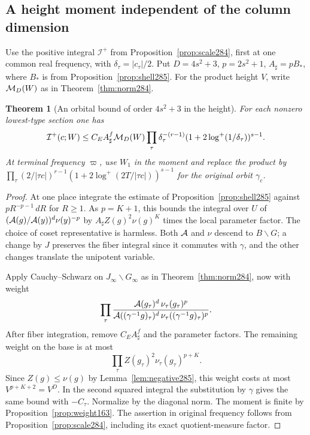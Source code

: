 \documentclass[a4paper,11pt]{article}
\newtheorem{theorem}[proposition]{Theorem}
\theoremstyle{definition}
\theoremstyle{remark}
\numberwithin{equation}{section}
\begin{document}
\subsection{A height moment independent of the column dimension}\label{nav:VII-53}
Use the positive integral \(\mathcal I^+\) from
Proposition~\ref{prop:scale284}, first at one common real
frequency, with \(\delta_\tau=|c_\tau|/2\). Put
\(D=4s^2+3\), \(p=2s^2+1\), \(A_\sharp=p B_*\),
where \(B_*\) is from Proposition~\ref{prop:shell285}.
For the product height \(V\), write \({\cal M}_D(W)\)
as in Theorem~\ref{thm:norm284}.

\begin{theorem}[An orbital bound of order \(4s^2+3\) in the height]\leavevmode
\label{thm:low285}
For each nonzero lowest-type section one has
\[
 \mathcal I^+(c;W)\le
 C_E A_\sharp^f {\cal M}_D(W)
 \prod_\tau \delta_\tau^{-(r-1)}
              (1+2\log^+(1/\delta_\tau))^{s-1}.
\]
At terminal frequency \(\varpi\), use \(W_1\) in the moment
and replace the product by
\(\prod_\tau (2/|\tau c|)^{r-1}
      (1+2\log^+(2T/|\tau c|))^{s-1}\)
for the original orbit \(\gamma_c\).
\end{theorem}
\begin{proof}
At one place integrate the estimate of
Proposition~\ref{prop:shell285} against
\(pR^{-p-1}\,dR\) for \(R\ge1\). As \(p=K+1\),
this bounds the integral over \(U\) of
\(({\cal A}(g)/{\cal A}(y))^d\nu(y)^{-p}\)
by \(A_\sharp Z(g)^2\nu(g)^K\) times the local parameter
factor. The choice of coset representative is harmless.
Both \({\cal A}\) and \(\nu\) descend to \(B\backslash G\);
a change by \(J\) preserves the fiber integral since it
commutes with \(\gamma\), and the other changes translate
the unipotent variable.

Apply Cauchy--Schwarz on \(J_\infty\backslash G_\infty\)
as in Theorem~\ref{thm:norm284}, now with weight
\[
 \prod_\tau
    \frac{{\cal A}(g_\tau)^d\,\nu_\tau(g_\tau)^p}
         {{\cal A}((\gamma^{-1}g)_\tau)^d\,
                         \nu_\tau((\gamma^{-1}g)_\tau)^p}.
\]
After fiber integration, remove \(C_E A_\sharp^f\) and
the parameter factors. The remaining weight on the base is at most
\[
             \prod_\tau Z(g_\tau)^2\nu_\tau(g_\tau)^{p+K}.
\]
Since \(Z(g)\le\nu(g)\) by Lemma~\ref{lem:negative285},
this weight costs at most \(V^{p+K+2}=V^D\).
In the second squared integral the substitution by \(\gamma\)
gives the same bound with \(-C_\tau\). Normalize by the
diagonal norm. The moment is finite by
Proposition~\ref{prop:weight163}. The assertion in original
frequency follows from Proposition~\ref{prop:scale284},
including its exact quotient-measure factor.
\end{proof}
\end{document}
